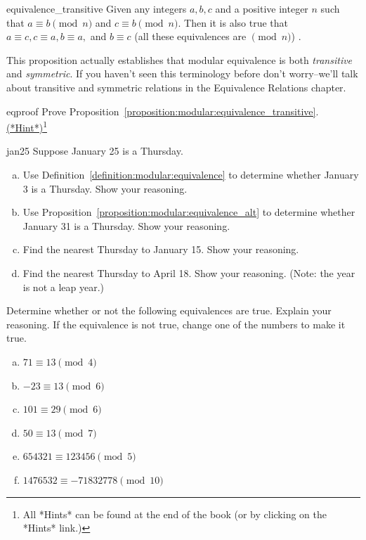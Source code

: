 \begin{prop}{equivalence_transitive}
Given any integers $a, b, c$ and a positive integer $n$ such that $a \equiv b \pmod{n}$ and $c \equiv b \pmod{n}$. Then it is also true that $a \equiv c, c \equiv a, b \equiv a,$ and $ b \equiv c$ (all these equivalences are $\pmod{n}$) .
\end{prop}

\begin{rem}
This proposition actually establishes that modular equivalence is  both \emph{transitive} and \emph{symmetric}. If you haven't seen this terminology before don't worry--we'll talk about transitive and symmetric relations in the Equivalence Relations chapter.
\end{rem}

\begin{exercise}{eqproof}
Prove Proposition~\ref{proposition:modular:equivalence_transitive}. 
\hyperref[sec:modular_arithmetic:hints]{(*Hint*)}\footnote{All *Hints* can be found at the end of the book (or by clicking on the *Hints* link.)}
\end{exercise}

\begin{exercise}{jan25}
Suppose January 25 is a Thursday. 
\begin{enumerate}[(a)]
\item
Use Definition~\ref{definition:modular:equivalence} to determine whether January 3 is a Thursday. Show your reasoning.
\item
Use Proposition~\ref{proposition:modular:equivalence_alt} to determine whether January 31 is a Thursday. Show your reasoning.
\item
Find the nearest Thursday to January 15. Show your reasoning.
\item
Find the nearest Thursday to April 18. Show your reasoning.  (Note: the year is not a leap year.)
\end{enumerate}
\end{exercise}

\begin{exercise}{22}
Determine whether or not the following equivalences are true. Explain your reasoning. If the equivalence is not true, change one of the numbers to make it true.
\begin{multicols}{2}
\begin{enumerate}[(a)]
 
\item
$71 \equiv 13 \pmod{4}$
 
 \item
 $-23 \equiv 13 \pmod{6}$

\item
$101 \equiv 29 \pmod{6}$

\item
$50 \equiv 13 \pmod{7}$

 \item
$654321 \equiv 123456  \pmod{5}$

 \item
$1476532 \equiv -71832778  \pmod{10}$
\end{enumerate}
\end{multicols}
\end{exercise}


